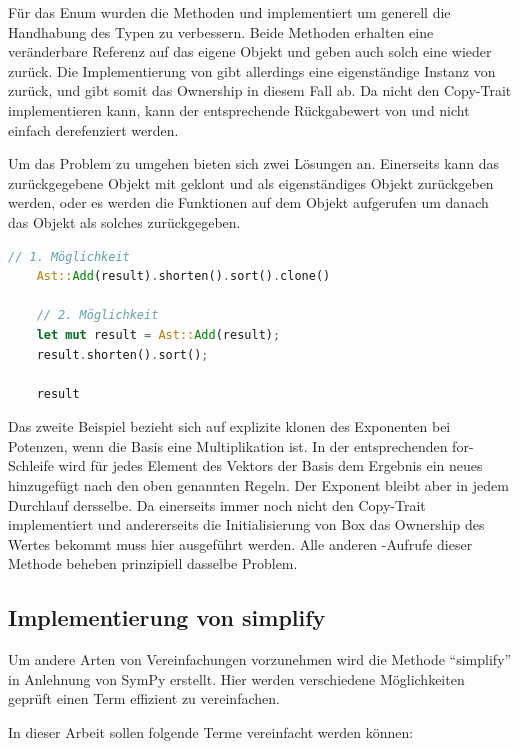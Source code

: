 \documentclass[11pt,a4paper, ngerman]{article}
\begin{document}
Für das Enum  wurden die Methoden  und  implementiert um generell die Handhabung des Typen zu verbessern. Beide Methoden erhalten eine veränderbare Referenz auf das eigene Objekt und geben auch solch eine wieder zurück. Die Implementierung von  gibt allerdings eine eigenständige Instanz von  zurück, und gibt somit das Ownership in diesem Fall ab. Da  nicht den Copy-Trait implementieren kann, kann der entsprechende Rückgabewert von  und  nicht einfach derefenziert werden.

Um das Problem zu umgehen bieten sich zwei Lösungen an. Einerseits kann das zurückgegebene Objekt mit  geklont und als eigenständiges Objekt zurückgeben werden, oder es werden die Funktionen auf dem Objekt aufgerufen um danach das Objekt als solches zurückgegeben.

\begin{lstlisting}[language=rust, caption={Mögliche Lösungen für Rückgabewerte}]
    // 1. Möglichkeit
    Ast::Add(result).shorten().sort().clone()

    // 2. Möglichkeit
    let mut result = Ast::Add(result);
    result.shorten().sort();

    result
\end{lstlisting}

Das zweite Beispiel bezieht sich auf explizite klonen des Exponenten bei Potenzen, wenn die Basis eine Multiplikation ist. In der entsprechenden for-Schleife wird für jedes Element des Vektors der Basis dem Ergebnis ein neues hinzugefügt nach den oben genannten Regeln. Der Exponent bleibt aber in jedem Durchlauf dersselbe. Da  einerseits immer noch nicht den Copy-Trait implementiert und andererseits die Initialisierung von Box das Ownership des Wertes bekommt muss hier  ausgeführt werden. Alle anderen -Aufrufe dieser Methode beheben prinzipiell dasselbe Problem.

\subsection{Implementierung von simplify}
Um andere Arten von Vereinfachungen vorzunehmen wird die Methode ``simplify'' in Anlehnung von SymPy \cite{SymPySimplify} erstellt. Hier werden verschiedene Möglichkeiten geprüft einen Term effizient zu vereinfachen.

In dieser Arbeit sollen folgende Terme vereinfacht werden können:
\end{document}
